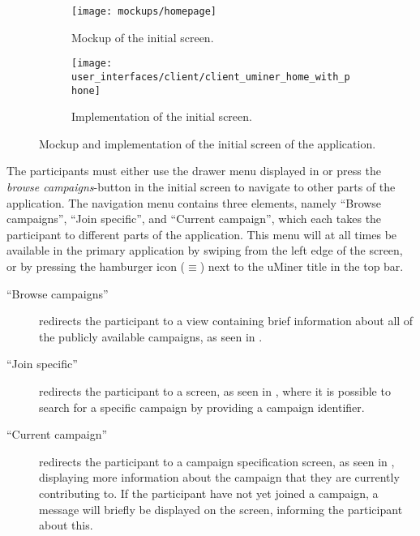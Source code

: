 \begin{figure}[!htbp]
    \begin{subfigure}[!t]{.48\textwidth}
        \centering
        \texttt{[image: mockups/homepage]}
        \caption{Mockup of the initial screen.}
        \label{fig:mockup_initial_screen}
    \end{subfigure}%
    \begin{subfigure}[!t]{.52\textwidth}
    \centering
        \texttt{[image: user\_interfaces/client/client\_uminer\_home\_with\_phone]}
        \caption{Implementation of the initial screen.}
        \label{fig:implementation_initial_screen}
    \end{subfigure}
    \caption{Mockup and implementation of the initial screen of the application.}
    \label{fig:initial_screen}
\end{figure}
\FloatBarrier

The participants must either use the drawer menu displayed in  or press the \emph{browse campaigns}-button in the initial screen to navigate to other parts of the application. The navigation menu contains three elements, namely ``Browse campaigns'', ``Join specific'', and ``Current campaign'', which each takes the participant to different parts of the application. This menu will at all times be available in the primary application by swiping from the left edge of the screen, or by pressing the hamburger icon ($\equiv$) next to the uMiner title in the top bar. 

\begin{description}
    \item[``Browse campaigns''] redirects the participant to a view containing brief information about all of the publicly available campaigns, as seen in .

    \item[``Join specific''] redirects the participant to a screen, as seen in , where it is possible to search for a specific campaign by providing a campaign identifier.

    \item[``Current campaign''] redirects the participant to a campaign specification screen, as seen in , displaying more information about the campaign that they are currently contributing to. If the participant have not yet joined a campaign, a message will briefly be displayed on the screen, informing the participant about this.
\end{description}

